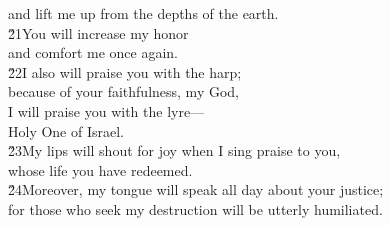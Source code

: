 \begin{poetry}
\poemll    and lift me up from the depths of the earth. \\
\poeml \v{21}You will increase my honor \\
\poemll    and comfort me once again. \\
\poeml \v{22}I also will praise you with the harp; \\
\poemll    because of your faithfulness, my God, \\
\poeml I will praise you with the lyre--- \\
\poemll    Holy One of Israel. \\
\poeml \v{23}My lips will shout for joy when I sing praise to you, \\
\poemll    whose life you have redeemed. \\
\poeml \v{24}Moreover, my tongue will speak all day about your justice; \\
\poemll    for those who seek my destruction will be utterly humiliated.
\end{poetry}

